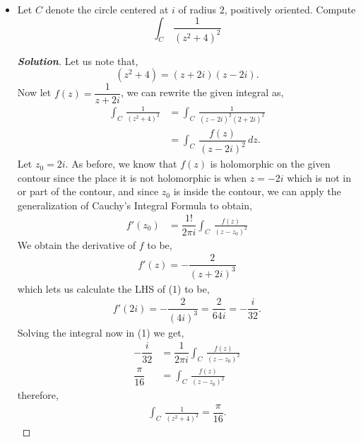 \documentclass[11pt]{article}
\newenvironment{problem}[2][Problem\!]{\begin{trivlist}
\item[\hskip \labelsep {\bfseries #1}\hskip \labelsep {\bfseries #2}]}{\end{trivlist}}
\newenvironment{solution}{\begin{proof}[\textbf{\textit{Solution}}] }{\end{proof}}
\begin{document}
\begin{problem}{8.1}
\begin{itemize}[itemsep=3em]
\item[(b)] Let $C$ denote the circle centered at $i$ of radius $2$, positively oriented. Compute
\[\int_C\,\frac{1}{(z^2 + 4)^2}\]
\begin{solution}
    Let us note that,
    \[(z^{2} + 4) = (z + 2i)(z - 2i).\]
    Now let $f(z) = \dfrac{1}{z + 2 i }$, we can rewrite the given integral as,
    \begin{align*}
        \int_C\,\frac{1}{(z^2 + 4)^2} &= \int_C\,\frac{1}{(z- 2 i)^{2} (2 +2 i)^{2}} \\
        &= \int_C\,\dfrac{f(z)}{(z - 2i)^{2}}\, d z .
    \end{align*}
    Let $z_0 = 2i$. As before, we know that $f(z)$ is holomorphic on the given contour since the place it is not holomorphic is when $z = -2i$ which is not in or part of the contour, and since $z_0$ is inside the contour, we can apply the generalization of Cauchy's Integral Formula to obtain,
    \begin{align}
        f'(z_0) &= \dfrac{1!}{2\pi i }\int_C\, \frac{f(z)}{(z - z_0)^{2}} 
    \end{align} 
    We obtain the derivative of $f$ to be,
    \begin{align*}
        f'(z) = -\dfrac{2}{(z + 2 i )^{3}}
    \end{align*}
    which lets us calculate the LHS of (1) to be,
    \begin{align*}
        f'(2i) = -\dfrac{2}{(4i)^{3}} = \dfrac{2}{64 i} = -\dfrac{i}{32}.
    \end{align*} 
    Solving the integral now in (1) we get,
    \begin{align*}
        -\dfrac{i}{32} &= \dfrac{1}{2\pi i}\int_C\, \frac{f(z)}{(z - z_0)^{2}} \\
        \dfrac{ \pi }{16} &= \int_C\, \frac{f(z)}{(z - z_0)^{2}}
    \end{align*}
    therefore,
    \begin{align*}
        \int_C\,\frac{1}{(z^2 + 4)^2} = \dfrac{\pi}{16}.
    \end{align*}
\end{solution}

\end{itemize}
\end{problem}

\newpage  %
\end{document}
